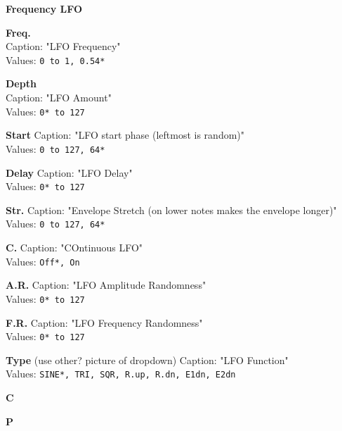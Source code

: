 \documentclass[
 11pt,
 twoside,
 a4paper,
 headinclude,
 footinclude,
 final                                 %
]{article}
\begin{document}
\begin{enumber}
\begin{enumber}
\begin{enumber}
\begin{enumber}

            \item \textbf{Frequency LFO}
            \begin{enumber}
               \item \textbf{Freq.} \\
                  Caption: "LFO Frequency" \\
                  Values: \texttt{0 to 1, 0.54*}
               \item \textbf{Depth} \\
                  Caption: "LFO Amount" \\
                  Values: \texttt{0* to 127}
               \item \textbf{Start}
                  Caption: "LFO start phase (leftmost is random)" \\
                  Values: \texttt{0 to 127, 64*}
               \item \textbf{Delay}
                  Caption: "LFO Delay" \\
                  Values: \texttt{0* to 127}
               \item \textbf{Str.}
                  Caption: "Envelope Stretch (on lower notes makes the
                     envelope longer)" \\
                  Values: \texttt{0 to 127, 64*}
               \item \textbf{C.}
                  Caption: "COntinuous LFO" \\
                  Values: \texttt{Off*, On}
               \item \textbf{A.R.}
                  Caption: "LFO Amplitude Randomness" \\
                  Values: \texttt{0* to 127}
               \item \textbf{F.R.}
                  Caption: "LFO Frequency Randomness" \\
                  Values: \texttt{0* to 127}
               \item \textbf{Type} (use other? picture of dropdown)
                  Caption: "LFO Function" \\
                  Values: \texttt{SINE*, TRI, SQR, R.up, R.dn, E1dn, E2dn}
               \item \textbf{C}
               \item \textbf{P}
            \end{enumber}


\end{enumber}
\end{enumber}
\end{enumber}
\end{enumber}
\end{document}
